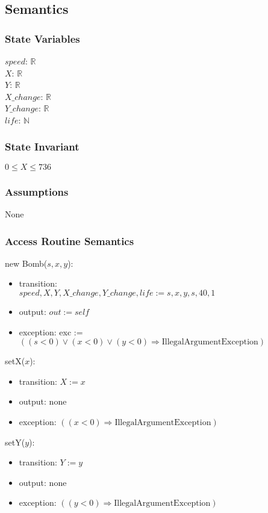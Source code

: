 \documentclass[12pt]{article}
\begin{document}
\subsection*{Semantics}
\subsubsection*{State Variables}
$\mathit{speed}$: $\mathbb{R}$\\
$\mathit{X}$: $\mathbb{R}$\\
$\mathit{Y}$: $\mathbb{R}$\\
$\mathit{X\_change}$: $\mathbb{R}$\\
$\mathit{Y\_change}$: $\mathbb{R}$\\
$\mathit{life}$: $\mathbb{N}$
\subsubsection*{State Invariant}
$0 \leq X \leq 736$
\subsubsection*{Assumptions}
None
\subsubsection*{Access Routine Semantics}
\noindent new Bomb($\mathit{s}, \mathit{x}, \mathit{y}$):
\begin{itemize}
\item transition: \\$\mathit{speed}, \mathit{X}, \mathit{Y}, \mathit{X\_change}, \mathit{Y\_change}, \mathit{life} := \mathit{s}, \mathit{x},
  \mathit{y}, \mathit{s}, 40, 1$
\item output: $out := \mathit{self}$
\item exception: exc := $((\mathit{s} < 0) \vee (\mathit{x} < 0) \vee 
  (\mathit{y} < 0) \Rightarrow \text{IllegalArgumentException})$
\end{itemize}

\noindent setX($\mathit{x}$):
\begin{itemize}
\item transition: $X := x$ 
\item output: none
\item exception: $((\mathit{x} < 0) \Rightarrow \text{IllegalArgumentException})$
\end{itemize}

\noindent setY($\mathit{y}$):
\begin{itemize}
\item transition: $Y := y$ 
\item output: none
\item exception: $((\mathit{y} < 0) \Rightarrow \text{IllegalArgumentException})$
\end{itemize}
\end{document}

